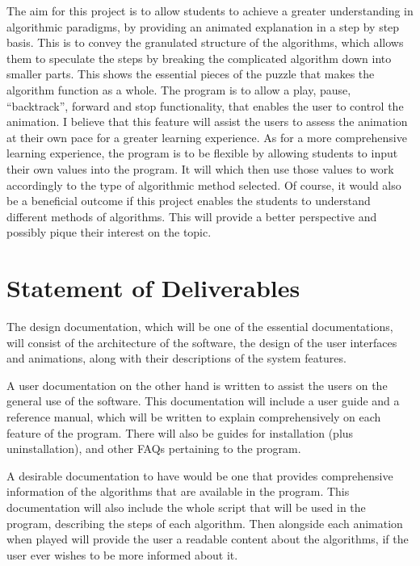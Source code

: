 \documentclass[12pt,a4paper,oneside]{report}
\begin{document}
The aim for this project is to allow students to achieve a greater understanding in algorithmic paradigms, by providing an animated explanation in a step by step basis. This is to convey the granulated structure of the algorithms, which allows them to speculate the steps by breaking the complicated algorithm down into smaller parts. This shows the essential pieces of the puzzle that makes the algorithm function as a whole. The program is to allow a play, pause, ``backtrack'', forward and stop functionality, that enables the user to control the animation. I believe that this feature will assist the users to assess the animation at their own pace for a greater learning experience. As for a more comprehensive learning experience, the program is to be flexible by allowing students to input their own values into the program. It will which then use those values to work accordingly to the type of algorithmic method selected. Of course, it would also be a beneficial outcome if this project enables the students to understand different methods of algorithms. This will provide a better perspective and possibly pique their interest on the topic.

\section*{Statement of Deliverables} 
The design documentation, which will be one of the essential documentations, will consist of the architecture of the software, the design of the user interfaces and animations, along with their descriptions of the system features. 

A user documentation on the other hand is written to assist the users on the general use of the software. This documentation will include a user guide and a reference manual, which will be written to explain comprehensively on each feature of the program. There will also be guides for installation (plus uninstallation), and other FAQs pertaining to the program. 

A desirable documentation to have would be one that provides comprehensive information of the algorithms that are available in the program. This documentation will also include the whole script that will be used in the program, describing the steps of each algorithm. Then alongside each animation when played will provide the user a readable content about the algorithms, if the user ever wishes to be more informed about it.
\end{document}
